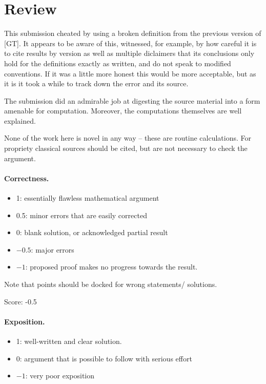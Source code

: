 \documentclass[11pt]{article}
\theoremstyle{definition}
\theoremstyle{remark}
\begin{document}
\maketitle

\section{Review}
This submission cheated by using a broken definition from the previous version of [GT].
It appears to be aware of this, witnessed, for example, by how careful it is to cite results by
version as well as multiple diclaimers that its conclusions only hold for the definitions exactly
as written, and do not speak to modified conventions. If it was a little more honest this would
be more acceptable, but as it is it took a while to track down the error and its source.

The submission did an admirable job at digesting the source material into a form amenable for
computation. Moreover, the computations themselves are well explained.

None of the work here is novel in any way -- these are routine calculations. For propriety
classical sources should be cited, but are not necessary to check the argument.

\paragraph{Correctness.}
\begin{itemize}
	\item  1: essentially flawless mathematical argument
	\item  0.5: minor errors that are easily corrected
	\item  0: blank solution, or acknowledged partial result
	\item  $-0.5$: major errors
	\item  $-1$: proposed proof makes no progress towards the result.
\end{itemize}
Note that points should be docked for wrong statements/ solutions.

\noindent Score: -0.5

\paragraph{Exposition.}
\begin{itemize}
	\item  1: well-written and clear solution.
	\item  0: argument that is possible to follow with serious effort
	\item  $-1$: very poor exposition
\end{itemize}
\end{document}
